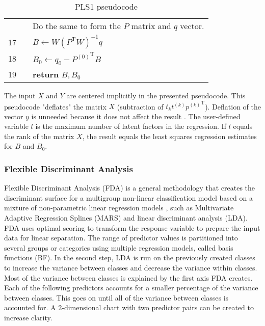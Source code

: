\documentclass[preprint,12pt]{elsarticle}
\begin{document}
\begin{table}[ht]
{\begin{tabular}{|r l l l l|}
            \rowcolor{backcolour} & & \multicolumn{3}{l|}{Do the same to form the $P$ matrix and $q$ vector.} \\
            \rowcolor{backcolour} 17 & & \multicolumn{3}{l|}{$B\gets W{(P^{\mathrm{T}}W)}^{-1}q$} \\
            \rowcolor{backcolour} 18 & & \multicolumn{3}{l|}{$B_{0}\gets q_{0}-{P^{(0)}}^{\mathrm{T}}B$} \\
            \rowcolor{backcolour} 19 & & \multicolumn{3}{l|}{\textbf{return} $B, B_{0}$} \\
            \hline
        \end{tabular}
    }
    \caption{PLS1 pseudocode}
    \label{tab:PLS1}
\end{table}

The input $X$ and $Y$ are centered implicitly in the presented pseudocode. This pseudocode "deflates" the matrix $X$ (subtraction of $t_{k}t^{(k)}{p^{(k)}}^{\mathrm{T}}$). Deflation of the vector $y$ is unneeded because it does not affect the result \cite{hoskuldsson1988pls}. The user-defined variable $l$ is the maximum number of latent factors in the regression. If $l$ equals the rank of the matrix $X$, the result equals the least squares regression estimates for $B$ and $B_{0}$.

\subsubsection{Flexible Discriminant Analysis}

Flexible Discriminant Analysis (FDA) is a general methodology that creates the discriminant surface for a multigroup non-linear classification model based on a mixture of non-parametric linear regression models \cite{hastie1995penalized}, such as Multivariate Adaptive Regression Splines (MARS) and linear discriminant analysis (LDA). FDA uses optimal scoring to transform the response variable to prepare the input data for linear separation. The range of predictor values is partitioned into several groups or categories using multiple regression models, called basis functions (BF). In the second step, LDA is run on the previously created classes to increase the variance between classes and decrease the variance within classes. 
Most of the variance between classes is explained by the first axis FDA creates. Each of the following predictors accounts for a smaller percentage of the variance between classes. This goes on until all of the variance between classes is accounted for. A $2$-dimensional chart with two predictor pairs can be created to increase clarity.
\end{document}
